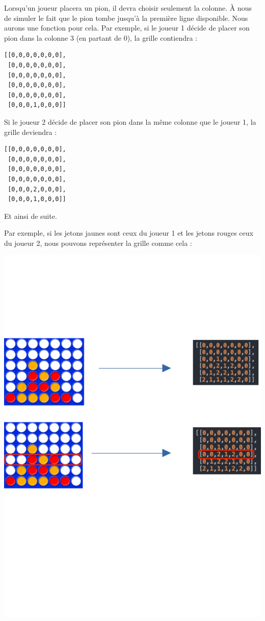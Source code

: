 \documentclass[11pt]{article}
\begin{document}
Lorsqu'un joueur placera un pion, il devra choisir seulement la colonne. À nous de \og simuler\fg{} le fait que le pion tombe jusqu'à la première ligne disponible. Nous aurons une fonction pour cela. Par exemple, si le joueur 1 décide de placer son pion dans la colonne 3 (en partant de 0), la grille contiendra :
\begin{verbatim}
[[0,0,0,0,0,0,0],
 [0,0,0,0,0,0,0],
 [0,0,0,0,0,0,0],
 [0,0,0,0,0,0,0],
 [0,0,0,0,0,0,0],
 [0,0,0,1,0,0,0]]
\end{verbatim}
Si le joueur 2 décide de placer son pion dans la même colonne que le joueur 1, la grille deviendra :
\begin{verbatim}
[[0,0,0,0,0,0,0],
 [0,0,0,0,0,0,0],
 [0,0,0,0,0,0,0],
 [0,0,0,0,0,0,0],
 [0,0,0,2,0,0,0],
 [0,0,0,1,0,0,0]]
\end{verbatim}

Et ainsi de suite.

Par exemple, si les jetons jaunes sont ceux du joueur 1 et les jetons rouges ceux du joueur 2, nous pouvons représenter la grille comme cela :

\begin{center}
\includegraphics[width=.9\linewidth]{./img/schema_liste.png}
\end{center}
\end{document}
